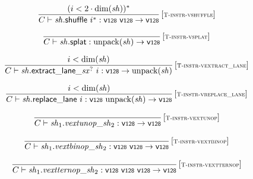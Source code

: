 $$
\begin{array}{@{}c@{}}\displaystyle
\frac{
(i < 2 \cdot {\mathrm{dim}}({\mathit{sh}}))^\ast
}{
C \vdash {\mathit{sh}}{.}\mathsf{shuffle}~{i^\ast} : \mathsf{v{\scriptstyle 128}}~\mathsf{v{\scriptstyle 128}} \rightarrow \mathsf{v{\scriptstyle 128}}
} \, {[\textsc{\scriptsize T{-}instr{-}vshuffle}]}
\qquad
\end{array}
$$

$$
\begin{array}{@{}c@{}}\displaystyle
\frac{
}{
C \vdash {\mathit{sh}}{.}\mathsf{splat} : {\mathrm{unpack}}({\mathit{sh}}) \rightarrow \mathsf{v{\scriptstyle 128}}
} \, {[\textsc{\scriptsize T{-}instr{-}vsplat}]}
\qquad
\end{array}
$$

$$
\begin{array}{@{}c@{}}\displaystyle
\frac{
i < {\mathrm{dim}}({\mathit{sh}})
}{
C \vdash {{\mathit{sh}}{.}\mathsf{extract\_lane}}{\mathsf{\_}}{{{\mathit{sx}}^?}}~i : \mathsf{v{\scriptstyle 128}} \rightarrow {\mathrm{unpack}}({\mathit{sh}})
} \, {[\textsc{\scriptsize T{-}instr{-}vextract\_lane}]}
\qquad
\end{array}
$$

$$
\begin{array}{@{}c@{}}\displaystyle
\frac{
i < {\mathrm{dim}}({\mathit{sh}})
}{
C \vdash {\mathit{sh}}{.}\mathsf{replace\_lane}~i : \mathsf{v{\scriptstyle 128}}~{\mathrm{unpack}}({\mathit{sh}}) \rightarrow \mathsf{v{\scriptstyle 128}}
} \, {[\textsc{\scriptsize T{-}instr{-}vreplace\_lane}]}
\qquad
\end{array}
$$

$$
\begin{array}{@{}c@{}}\displaystyle
\frac{
}{
C \vdash {\mathit{sh}}_1 {.} {{\mathit{vextunop}}}{\mathsf{\_}}{{\mathit{sh}}_2} : \mathsf{v{\scriptstyle 128}} \rightarrow \mathsf{v{\scriptstyle 128}}
} \, {[\textsc{\scriptsize T{-}instr{-}vextunop}]}
\qquad
\end{array}
$$

$$
\begin{array}{@{}c@{}}\displaystyle
\frac{
}{
C \vdash {\mathit{sh}}_1 {.} {{\mathit{vextbinop}}}{\mathsf{\_}}{{\mathit{sh}}_2} : \mathsf{v{\scriptstyle 128}}~\mathsf{v{\scriptstyle 128}} \rightarrow \mathsf{v{\scriptstyle 128}}
} \, {[\textsc{\scriptsize T{-}instr{-}vextbinop}]}
\qquad
\end{array}
$$

$$
\begin{array}{@{}c@{}}\displaystyle
\frac{
}{
C \vdash {\mathit{sh}}_1 {.} {{\mathit{vextternop}}}{\mathsf{\_}}{{\mathit{sh}}_2} : \mathsf{v{\scriptstyle 128}}~\mathsf{v{\scriptstyle 128}}~\mathsf{v{\scriptstyle 128}} \rightarrow \mathsf{v{\scriptstyle 128}}
} \, {[\textsc{\scriptsize T{-}instr{-}vextternop}]}
\qquad
\end{array}
$$

